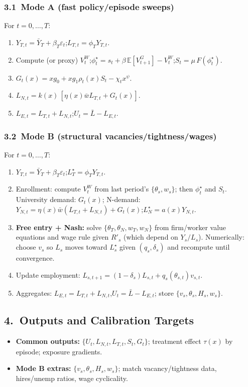 \subsubsection*{3.1\ Mode A (fast policy/episode sweeps)}
For $t=0,\ldots,T$:
\begin{enumerate}
	\item $Y_{T,t}=\bar Y_T+\beta_T\varepsilon_t$;\quad $L_{T,t}=\phi_T Y_{T,t}$.
	\item Compute (or proxy) $V^W_t$;\quad $\phi_t^\star=s_t+\beta\,\mathbb{E}[V^G_{t+1}]-V^W_t$;\quad $S_t=\mu\,F(\phi_t^\star)$.
	\item $G_t(x)=x g_0+x g_1 \rho_t(x) S_t-\chi_t x^{\psi}$.
	\item $L_{N,t}=k(x)\,[\eta(x)\bar w L_{T,t}+G_t(x)]$.
	\item $L_{E,t}=L_{T,t}+L_{N,t}$;\quad $U_t=\bar L-L_{E,t}$.
\end{enumerate}

\subsubsection*{3.2\ Mode B (structural vacancies/tightness/wages)}
For $t=0,\ldots,T$:
\begin{enumerate}
	\item $Y_{T,t}=\bar Y_T+\beta_T\varepsilon_t$;\quad $L_T^\star=\phi_T Y_{T,t}$.
	\item Enrollment: compute $V^W_t$ from last period's $\{\theta_s,w_s\}$; then $\phi_t^\star$ and $S_t$. University demand: $G_t(x)$; N-demand: $Y_{N,t}=\eta(x)\bar w(L_{T,t}+L_{N,t})+G_t(x)$;\quad $L_N^\star=a(x)Y_{N,t}$.
	\item \textbf{Free entry + Nash:} solve $\{\theta_T,\theta_N,w_T,w_N\}$ from firm/worker value equations and wage rule given $R'_s$ (which depend on $Y_s/L_s$). Numerically: choose $v_s$ so $L_s$ moves toward $L_s^\star$ given $(q_s,\delta_s)$ and recompute until convergence.
	\item Update employment: $L_{s,t+1}=(1-\delta_s)L_{s,t}+q_s(\theta_{s,t})v_{s,t}$.
	\item Aggregates: $L_{E,t}=L_{T,t}+L_{N,t}$,\quad $U_t=\bar L-L_{E,t}$; store $\{v_s,\theta_s,H_s,w_s\}$.
\end{enumerate}

\subsection*{4.\ Outputs and Calibration Targets}
\begin{itemize}
	\item \textbf{Common outputs:} $\{U_t,L_{N,t},L_{T,t},S_t,G_t\}$;\; treatment effect $\tau(x)$ by episode;\; exposure gradients.
	\item \textbf{Mode B extras:} $\{v_s,\theta_s,H_s,w_s\}$; match vacancy/tightness data, hires/unemp ratios, wage cyclicality.
\end{itemize}

